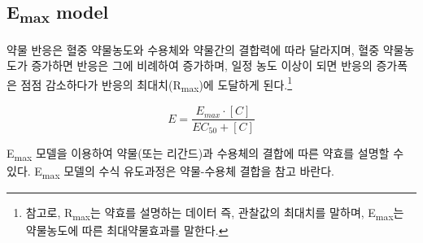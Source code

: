 \documentclass[
  11pt,
  krantz2, a4paper, twoside]{krantz}
\theoremstyle{definition}
\theoremstyle{definition}
\theoremstyle{definition}
\theoremstyle{remark}
\begin{document}
\hypertarget{emax-model}{%
\subsection{\texorpdfstring{E\textsubscript{max} model}{Emax model}}\label{emax-model}}

약물 반응은 혈중 약물농도와 수용체와 약물간의 결합력에 따라 달라지며, 혈중 약물농도가 증가하면 반응은 그에 비례하여 증가하며, 일정 농도 이상이 되면 반응의 증가폭은 점점 감소하다가 반응의 최대치(R\textsubscript{max})에 도달하게 된다.\footnote{참고로, R\textsubscript{max}는 약효를 설명하는 데이터 즉, 관찰값의 최대치를 말하며, E\textsubscript{max}는 약물농도에 따른 최대약물효과를 말한다.}

\begin{equation}
E = \frac{E_{max} \cdot [C]}{EC_{50} + [C]}
\label{eq:emax-model}
\end{equation}

E\textsubscript{max} 모델을 이용하여 약물(또는 리간드)과 수용체의 결합에 따른 약효를 설명할 수 있다. E\textsubscript{max} 모델의 수식 유도과정은 약물-수용체 결합을 참고 바란다.
\end{document}
